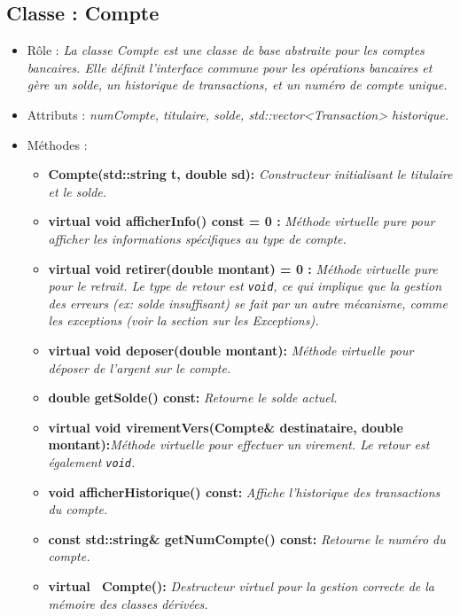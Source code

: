 \subsection{Classe : Compte}
\begin{itemize}[leftmargin=*]
\item Rôle : \textit{La classe Compte est une classe de base abstraite pour les comptes bancaires. Elle définit l'interface commune pour les opérations bancaires et gère un solde, un historique de transactions, et un numéro de compte unique.}
\item Attributs : \textit{numCompte, titulaire, solde, std::vector<Transaction> historique.}
\item Méthodes : 
     \begin{itemize}[leftmargin=*]
      \item \textbf{Compte(std::string t, double sd):} \textit{Constructeur initialisant le titulaire et le solde.}
      \item \textbf{virtual void afficherInfo() const = 0 :} \textit{Méthode virtuelle pure pour afficher les informations spécifiques au type de compte.}
      \item \textbf{virtual void retirer(double montant) = 0 :} \textit{Méthode virtuelle pure pour le retrait. Le type de retour est \texttt{void}, ce qui implique que la gestion des erreurs (ex: solde insuffisant) se fait par un autre mécanisme, comme les exceptions (voir la section sur les Exceptions).}
      \item \textbf{virtual void deposer(double montant):} \textit{Méthode virtuelle pour déposer de l'argent sur le compte.}
      \item \textbf{double getSolde() const:} \textit{Retourne le solde actuel.}
      \item \textbf{virtual void virementVers(Compte& destinataire, double montant):}\textit{Méthode virtuelle pour effectuer un virement. Le retour est également \texttt{void}.}
      \item \textbf{void afficherHistorique() const:} \textit{Affiche l'historique des transactions du compte.}
      \item \textbf{const std::string& getNumCompte() const:} \textit{Retourne le numéro du compte.}
      \item \textbf{virtual ~Compte():} \textit{Destructeur virtuel pour la gestion correcte de la mémoire des classes dérivées.}
      \end{itemize}
\end{itemize} 

